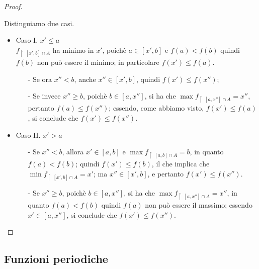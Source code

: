 \documentclass{article}
\theoremstyle{plain}
\theoremstyle{definition}
\theoremstyle{remark}
\begin{document}
\begin{proof}
\begin{itemize}
        Distinguiamo due casi. 
        \begin{itemize}
            \item Caso I. $x'\leq a$\\
            $f_{\upharpoonright \ [x',b]\cap A}$ ha minimo in $x'$, poichè $a\in [x',b]$ e $f(a)<f(b)$ quindi $f(b)$ non può essere il minimo; in particolare $f(x')\leq f(a)$.
            \begin{itemize}
                \item[-] Se ora $x''<b$, anche $x''\in[x',b]$, quindi $f(x')\leq f(x'')$;
                \item[-] Se invece $x''\geq b$, poichè $b\in[a,x'']$, si ha che $\max f_{\upharpoonright \ [a,x'']\cap A}=x''$, pertanto $f(a)\leq f(x'')$; essendo, come abbiamo visto, $f(x')\leq f(a)$, si conclude che $f(x')\leq f(x'')$.
            \end{itemize}            
            \item Caso II. $x'> a$
            \begin{itemize}
                \item[-] Se $x''<b$, allora $x'\in[a,b]$ e $\max f_{\upharpoonright \ [a,b]\cap A}=b$, in quanto $f(a)<f(b)$; quindi $f(x')\leq f(b)$, il che implica che $\min f_{\upharpoonright \ [x',b]\cap A}=x'$; ma $x''\in[x',b]$, e pertanto $f(x')\leq f(x'')$.
                \item[-] Se $x''\geq b$, poichè $b\in [a,x'']$, si ha che $\max f_{\upharpoonright \ [a,x'']\cap A}=x''$, in quanto $f(a)<f(b)$ quindi $f(a)$ non può essere il massimo; essendo $x'\in [a,x'']$, si conclude che $f(x')\leq f(x'')$.
            \end{itemize}
        \end{itemize}
    \end{itemize}
\end{proof}

\vspace{10pt}

\subsection{Funzioni periodiche}

\vspace{10pt}
\end{document}
